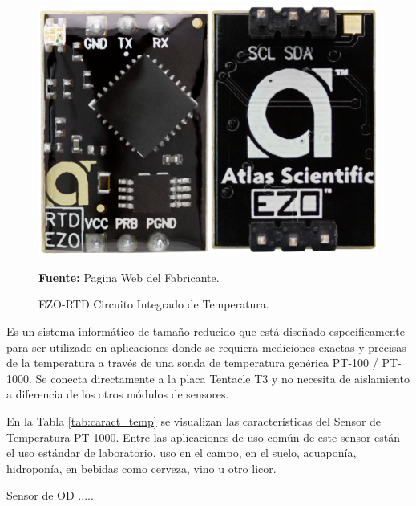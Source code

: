 \begin{figure}[H]
    \centering
    \includegraphics[scale=0.4]{Imagenes/2021/imag38.png}
    \caption[EZO-RTD Circuito Integrado de Temperatura]{EZO-RTD Circuito Integrado de Temperatura.}{\textbf{Fuente: }Pagina Web del Fabricante.}
    \label{fig:4.16}
\end{figure}

Es un sistema informático de tamaño reducido que está diseñado específicamente para ser utilizado en aplicaciones donde se requiera mediciones exactas y precisas de la temperatura a través de una sonda de temperatura genérica PT-100 / PT-1000. Se conecta directamente a la placa Tentacle T3 y no necesita de aislamiento a diferencia de los otros módulos de sensores.

En la Tabla \ref{tab:caract_temp} se visualizan las características del Sensor de Temperatura PT-1000.
Entre las aplicaciones de uso común de este sensor están el uso est\'andar de laboratorio, uso en el campo, en el suelo, acuapon\'ia, hidroponía, en bebidas como cerveza, vino u otro licor.

Sensor de OD .....


